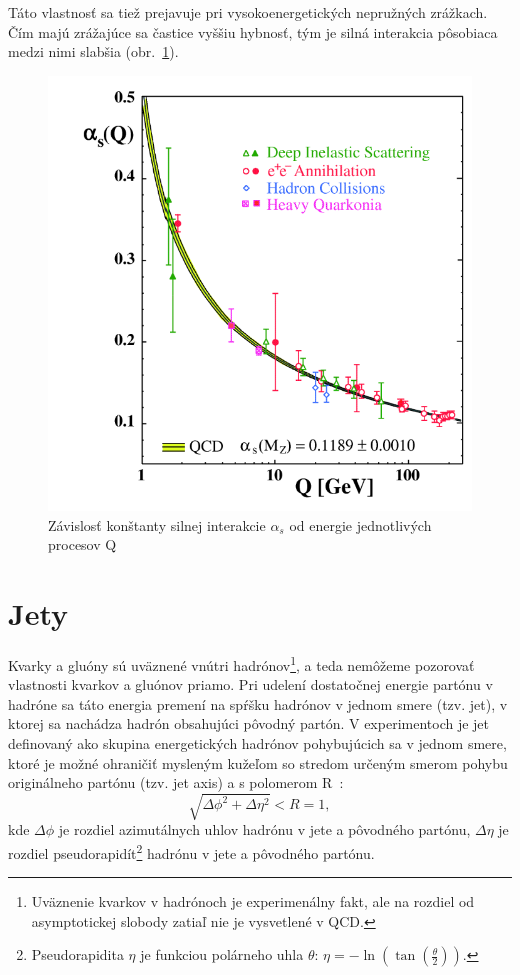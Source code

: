 \documentclass[thesismargins, thesislinespacing]{rnthesis}
\begin{document}
Táto vlastnosť sa tiež prejavuje pri vysokoenergetických nepružných zrážkach. Čím majú zrážajúce sa častice vyššiu hybnosť, tým je silná interakcia pôsobiaca medzi nimi slabšia (obr.~\ref{alfa}).
\begin{figure}
	\centering
	\includegraphics[scale=0.4]{./Obrazky_praca/zrazka.png}
	\caption{Závislosť konštanty silnej interakcie $\alpha_s$ od energie jednotlivých procesov Q \cite{3}}
	\label{alfa}
\end{figure}


\section{Jety}

Kvarky a gluóny sú uväznené vnútri hadrónov\footnote{Uväznenie kvarkov v hadrónoch je experimenálny fakt, ale na rozdiel od asymptotickej slobody zatiaľ nie je vysvetlené v QCD.}, a teda nemôžeme pozorovať vlastnosti kvarkov a gluónov priamo. Pri udelení dostatočnej energie partónu v hadróne sa táto energia premení na spŕšku hadrónov v jednom smere (tzv. jet), v ktorej sa nachádza hadrón obsahujúci pôvodný partón. V experimentoch je jet definovaný ako skupina energe\-tických hadrónov pohybujúcich sa v jednom smere, ktoré je možné ohraničiť mysleným kužeľom so stredom určeným smerom pohybu originálneho partónu (tzv. jet axis) a s polomerom R~\cite{4}:
\begin{equation}
\sqrt{\Delta \phi^2 + \Delta \eta^2}<R=1,
\end{equation}
kde $\Delta \phi$ je rozdiel azimutálnych uhlov hadrónu v jete a pôvodného partónu, $\Delta \eta$ je rozdiel pseudorapidít\footnote{Pseudorapidita $\eta$ je funkciou polárneho uhla $\theta$: $\eta = - \ln( \tan (\frac{\theta}{2}))$.} hadrónu v jete a pôvodného partónu.
\end{document}
